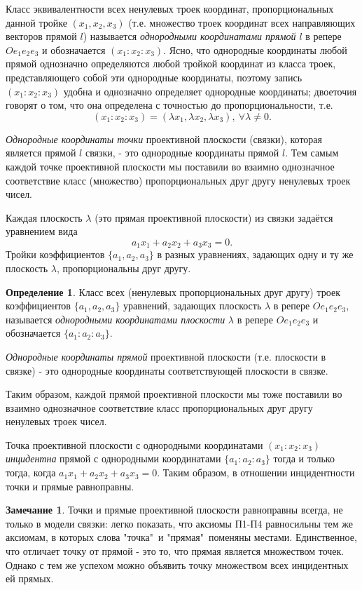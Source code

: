 \documentclass[a4paper, 12pt]{article}
\theoremstyle{definition}
\newtheorem*{definition}{Определение}
\newtheorem*{remark}{Замечание}
\begin{document}
Класс эквивалентности всех ненулевых троек координат, пропорциональных данной тройке $(x_1, x_2, x_3)$ (т.е. множество троек координат всех направляющих векторов прямой $l$) называется \textit{однородными координатами прямой $l$} в репере $Oe_1e_2e_3$ и обозначается $(x_1:x_2:x_3)$. Ясно, что однородные координаты любой прямой однозначно определяются любой тройкой координат из класса троек, представляющего собой эти однородные координаты, поэтому запись $(x_1:x_2:x_3)$ удобна и однозначно определяет однородные координаты; двоеточия говорят о том, что она определена с точностью до пропорциональности, т.е. 
\[ (x_1:x_2:x_3) =  (\lambda x_1, \lambda x_2, \lambda x_3), \ \forall \lambda \neq 0.\]

\textit{Однородные координаты точки} проективной плоскости (связки), которая является прямой $l$ связки, - это однородные координаты прямой $l$. Тем самым каждой точке проективной плоскости мы поставили во взаимно однозначное соответствие класс (множество) пропорциональных друг другу ненулевых троек чисел.

Каждая плоскость $\lambda$ (это прямая проективной плоскости) из связки задаётся уравнением вида 
\[ a_1x_1 + a_2x_2 + a_3x_3 = 0. \]
Тройки коэффициентов $\{a_1,a_2,a_3\}$ в разных уравнениях, задающих одну и ту же плоскость $\lambda$, пропорциональны друг другу.

\begin{definition}
    Класс всех (ненулевых пропорциональных друг другу) троек коэффициентов $\{a_1,a_2,a_3\}$ уравнений, задающих плоскость $\lambda$ в репере $Oe_1e_2e_3$, называется \textit{однородными координатами плоскости} $\lambda$ в репере $Oe_1e_2e_3$ и обозначается $\{a_1:a_2:a_3\}$.

    \textit{Однородные координаты прямой} проективной плоскости (т.е. плоскости в связке) - это однородные координаты соответствующей плоскости в связке.
\end{definition}

Таким образом, каждой прямой проективной плоскости мы тоже поставили во взаимно однозначное соответствие класс пропорциональных друг другу ненулевых троек чисел.

Точка проективной плоскости с однородными координатами $(x_1:x_2:x_3)$ \textit{инцидентна} прямой с однородными координатами $\{a_1:a_2:a_3\}$ тогда и только тогда, когда $a_1x_1 + a_2x_2 + a_3x_3 = 0$. Таким образом, в отношении инцидентности точки и прямые равноправны.

\begin{remark}
    Точки и прямые проективной плоскости равноправны всегда, не только в модели связки: легко показать, что аксиомы П1-П4 равносильны тем же аксиомам, в которых слова "точка"\ и "прямая"\ поменяны местами. Единственное, что отличает точку от прямой - это то, что прямая является множеством точек. Однако с тем же успехом можно объявить точку множеством всех инцидентных ей прямых.
\end{remark}
\end{document}
